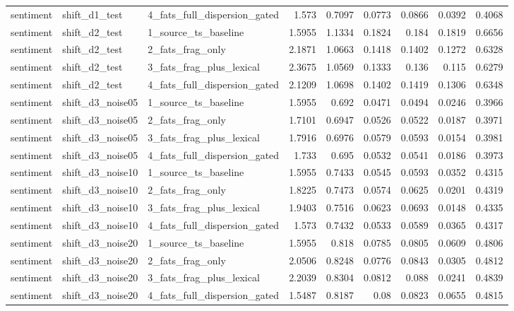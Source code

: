 \begin{table}[htbp]
{\begin{tabular}{lllrrrrrr}
sentiment & shift\_d1\_test & 4\_fats\_full\_dispersion\_gated & 1.573 & 0.7097 & 0.0773 & 0.0866 & 0.0392 & 0.4068 \\
sentiment & shift\_d2\_test & 1\_source\_ts\_baseline & 1.5955 & 1.1334 & 0.1824 & 0.184 & 0.1819 & 0.6656 \\
sentiment & shift\_d2\_test & 2\_fats\_frag\_only & 2.1871 & 1.0663 & 0.1418 & 0.1402 & 0.1272 & 0.6328 \\
sentiment & shift\_d2\_test & 3\_fats\_frag\_plus\_lexical & 2.3675 & 1.0569 & 0.1333 & 0.136 & 0.115 & 0.6279 \\
sentiment & shift\_d2\_test & 4\_fats\_full\_dispersion\_gated & 2.1209 & 1.0698 & 0.1402 & 0.1419 & 0.1306 & 0.6348 \\
sentiment & shift\_d3\_noise05 & 1\_source\_ts\_baseline & 1.5955 & 0.692 & 0.0471 & 0.0494 & 0.0246 & 0.3966 \\
sentiment & shift\_d3\_noise05 & 2\_fats\_frag\_only & 1.7101 & 0.6947 & 0.0526 & 0.0522 & 0.0187 & 0.3971 \\
sentiment & shift\_d3\_noise05 & 3\_fats\_frag\_plus\_lexical & 1.7916 & 0.6976 & 0.0579 & 0.0593 & 0.0154 & 0.3981 \\
sentiment & shift\_d3\_noise05 & 4\_fats\_full\_dispersion\_gated & 1.733 & 0.695 & 0.0532 & 0.0541 & 0.0186 & 0.3973 \\
sentiment & shift\_d3\_noise10 & 1\_source\_ts\_baseline & 1.5955 & 0.7433 & 0.0545 & 0.0593 & 0.0352 & 0.4315 \\
sentiment & shift\_d3\_noise10 & 2\_fats\_frag\_only & 1.8225 & 0.7473 & 0.0574 & 0.0625 & 0.0201 & 0.4319 \\
sentiment & shift\_d3\_noise10 & 3\_fats\_frag\_plus\_lexical & 1.9403 & 0.7516 & 0.0623 & 0.0693 & 0.0148 & 0.4335 \\
sentiment & shift\_d3\_noise10 & 4\_fats\_full\_dispersion\_gated & 1.573 & 0.7432 & 0.0533 & 0.0589 & 0.0365 & 0.4317 \\
sentiment & shift\_d3\_noise20 & 1\_source\_ts\_baseline & 1.5955 & 0.818 & 0.0785 & 0.0805 & 0.0609 & 0.4806 \\
sentiment & shift\_d3\_noise20 & 2\_fats\_frag\_only & 2.0506 & 0.8248 & 0.0776 & 0.0843 & 0.0305 & 0.4812 \\
sentiment & shift\_d3\_noise20 & 3\_fats\_frag\_plus\_lexical & 2.2039 & 0.8304 & 0.0812 & 0.088 & 0.0241 & 0.4839 \\
sentiment & shift\_d3\_noise20 & 4\_fats\_full\_dispersion\_gated & 1.5487 & 0.8187 & 0.08 & 0.0823 & 0.0655 & 0.4815 \\
\bottomrule
\end{tabular}%
}
\end{table}